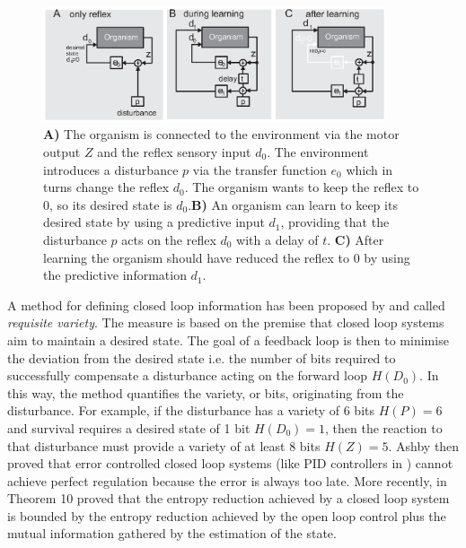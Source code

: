 \begin{figure}[!hbt]
	\begin{center}
		\includegraphics[width=0.9\textwidth]{figures/ppmeasure/1}
	\end{center}
	\caption[Information flow in the adaptive controller]{ 
	  {\bf A)} The organism is connected to the
          environment via the motor output $Z$ and the reflex sensory
          input $d_{0}$. The environment introduces a disturbance $p$
          via the transfer function $e_0$ which in turns change the
          reflex $d_{0}$. The organism wants to keep the reflex to 0, so
          its desired state is $d_{0}$.{\bf B)} An organism can learn to
          keep its desired state by using a predictive input $d_{1}$,
          providing that the disturbance $p$ acts on the reflex $d_{0}$
          with a delay of $t$. {\bf C)} After learning the organism
          should have reduced the reflex to 0 by using the predictive
          information $d_{1}$.  
	  \label{PPmeasure:Figure1}}
\end{figure}
 
A method for defining closed loop information has been proposed by
\citet{Ashby1956:IntroCybernetics} and called \textit{requisite variety}. 
The measure is based on the premise
that closed loop systems aim to maintain a desired state.  The goal of
a feedback loop is then to minimise the deviation from the desired
state i.e. the number of bits required to successfully compensate a
disturbance acting on the forward loop $H(D_{0})$. In this way, the
method quantifies the variety, or bits, originating from the
disturbance. For example, if the disturbance has a variety of 6 bits
$H(P)=6$ and survival requires a desired state of 1 bit
$H(D_{0})=1$, then the reaction to that disturbance must provide a
variety of at least 8 bits $H(Z)=5$.  Ashby then proved that error controlled
closed loop systems (like PID controllers in \citet{PID}) cannot achieve
perfect regulation because the error is always too late.  More
recently, \citet{PhysRevLett.84.1156} in Theorem 10
proved that the entropy reduction achieved by a closed loop system is
bounded by the entropy reduction achieved by the open loop control
plus the mutual information gathered by the estimation of the state.

